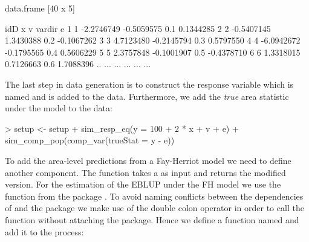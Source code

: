 \documentclass[article]{ajs}
\begin{document}
\begin{Schunk}
\begin{Soutput}
data.frame [40 x 5]

   idD          x          v vardir          e
1    1 -2.2746749 -0.5059575    0.1  0.1344285
2    2 -0.5407145  1.3430388    0.2 -0.1067262
3    3  4.7123480 -0.2145794    0.3  0.5797550
4    4 -6.0942672 -0.1795565    0.4  0.5606229
5    5  2.3757848 -0.1001907    0.5 -0.4378710
6    6  1.3318015  0.7126663    0.6  1.7088396
.. ...        ...        ...    ...        ...
\end{Soutput}
\end{Schunk}

The last step in data generation is to construct the response variable which is named  and is added to the data. Furthermore, we add the \textit{true} area statistic under the model to the data:

\begin{Schunk}
\begin{Sinput}
> setup <- setup %
+   sim_resp_eq(y = 100 + 2 * x + v + e) %
+   sim_comp_pop(comp_var(trueStat = y - e))
\end{Sinput}
\end{Schunk}

To add the area-level predictions from a Fay-Herriot model we need to define another component. The function takes a  as input and returns the modified version. For the estimation of the EBLUP under the FH model we use the function  from the package  \citep{molina13}. To avoid naming conflicts between the dependencies of  and the package  \citep{wickham14a} we make use of the double colon operator in order to call the function  without attaching the package. Hence we define a function named  and add it to the process:
\end{document}
